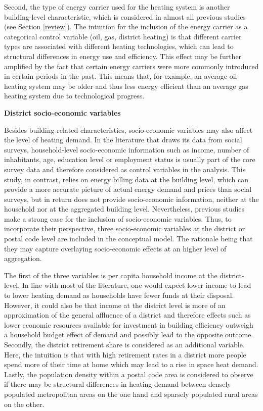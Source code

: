 \documentclass[12pt,twoside]{reedthesis}
\begin{document}
Second, the type of energy carrier used for the heating system is another building-level characteristic, which is considered in almost all previous studies (see Section \ref{review}). The intuition for the inclusion of the energy carrier as a categorical control variable (oil, gas, district heating) is that different carrier types are associated with different heating technologies, which can lead to structural differences in energy use and efficiency. This effect may be further amplified by the fact that certain energy carriers were more commonly introduced in certain periods in the past. This means that, for example, an average oil heating system may be older and thus less energy efficient than an average gas heating system due to technological progress.

\textbf{District socio-economic variables}

Besides building-related characteristics, socio-economic variables may also affect the level of heating demand. In the literature that draws its data from social surveys, household-level socio-economic information such as income, number of inhabitants, age, education level or employment status is usually part of the core survey data and therefore considered as control variables in the analysis. This study, in contrast, relies on energy billing data at the building level, which can provide a more accurate picture of actual energy demand and prices than social surveys, but in return does not provide socio-economic information, neither at the household nor at the aggregated building level. Nevertheless, previous studies make a strong case for the inclusion of socio-economic variables. Thus, to incorporate their perspective, three socio-economic variables at the district or postal code level are included in the conceptual model. The rationale being that they may capture overlaying socio-economic effects at an higher level of aggregation.

The first of the three variables is per capita household income at the district-level. In line with most of the literature, one would expect lower income to lead to lower heating demand as households have fewer funds at their disposal. However, it could also be that income at the district level is more of an approximation of the general affluence of a district and therefore effects such as lower economic resources available for investment in building efficiency outweigh a household budget effect of demand and possibly lead to the opposite outcome. Secondly, the district retirement share is considered as an additional variable. Here, the intuition is that with high retirement rates in a district more people spend more of their time at home which may lead to a rise in space heat demand. Lastly, the population density within a postal code area is considered to observe if there may be structural differences in heating demand between densely populated metropolitan areas on the one hand and sparsely populated rural areas on the other.
\end{document}
